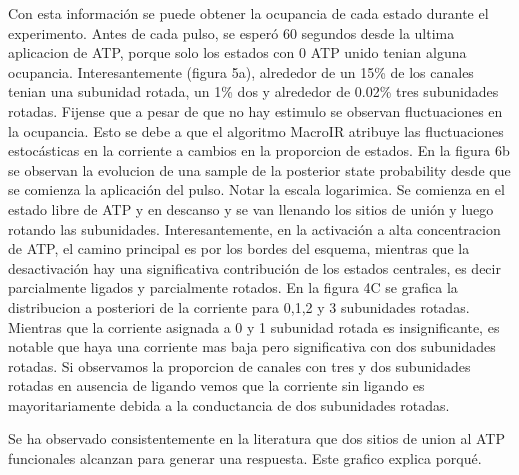 \documentclass[a4paper,12pt]{article}
\begin{document}
		Con esta información se puede obtener la ocupancia de cada estado durante el experimento. Antes de cada pulso, se esperó 60 segundos desde la ultima aplicacion de ATP, porque solo los estados con 0 ATP unido tenian alguna ocupancia. Interesantemente (figura 5a), alrededor de un 15\% de los canales tenian una subunidad rotada, un 1\% dos y alrededor de 0.02\% tres subunidades rotadas. Fijense que a pesar de que no hay estimulo se observan fluctuaciones en la ocupancia. Esto se debe a que el algoritmo MacroIR atribuye las fluctuaciones estocásticas en la corriente a cambios en la proporcion de estados. 
		En la figura 6b se observan la evolucion de una sample de la  posterior state probability desde que se comienza la aplicación del pulso. Notar la escala logarimica. Se comienza en el estado libre de ATP y en descanso y se van llenando los sitios de unión y luego rotando las subunidades. Interesantemente, en la activación a alta concentracion de ATP, el camino principal  es por los bordes del esquema, mientras que la desactivación hay una significativa contribución de los estados centrales, es decir parcialmente ligados y parcialmente rotados. 
		En la figura 4C se grafica la distribucion a posteriori de la corriente para 0,1,2 y 3 subunidades rotadas. Mientras que la corriente asignada a 0 y 1 subunidad rotada es insignificante, es notable que haya una corriente mas baja pero significativa con dos subunidades rotadas. Si observamos la proporcion de canales con tres y dos subunidades rotadas en ausencia de ligando vemos que la corriente sin ligando es mayoritariamente debida a la conductancia de dos subunidades rotadas. 
		
		Se ha observado consistentemente en la literatura que dos sitios de union al ATP funcionales alcanzan para generar una respuesta. Este grafico explica porqué. 
	
\end{document}
